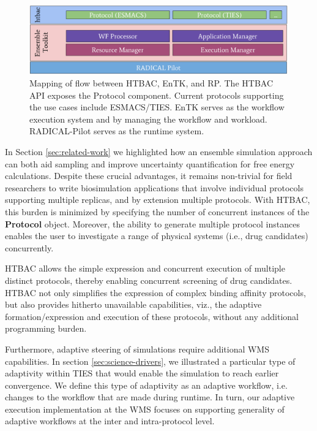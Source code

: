 \begin{figure}
  \centering
   \includegraphics[width=\columnwidth]{figures/isc_htbac_integration_with_entk_RP-4.pdf}
  \caption{Mapping of flow between HTBAC, EnTK, and RP. The HTBAC API exposes the Protocol
  component. Current protocols supporting the use cases include ESMACS/TIES.  
  EnTK serves as the workflow execution system and by managing the workflow and workload. 
  RADICAL-Pilot serves as the runtime system.}
\label{fig:integration}
\end{figure}



In Section \ref{sec:related-work} we highlighted how an ensemble
simulation approach can both aid sampling and improve uncertainty
quantification for free energy calculations. Despite these crucial advantages,
it remains non-trivial for field researchers to write biosimulation
applications that involve individual protocols supporting multiple replicas,
and by extension multiple protocols. With HTBAC, this burden is minimized by
specifying the number of concurrent instances of the \textbf{Protocol} object.
Moreover, the ability to generate multiple protocol instances enables the user
to investigate a range of physical systems (i.e., drug candidates)
concurrently.

HTBAC allows the simple expression and concurrent execution of multiple
distinct protocols, thereby enabling concurrent screening of drug candidates.
HTBAC not only simplifies the expression of complex binding affinity
protocols, but also provides hitherto unavailable capabilities, viz., the
adaptive formation/expression and execution of these protocols, without any
additional programming burden. 

Furthermore, adaptive steering of simulations require additional WMS capabilities. 
In section \ref{sec:science-drivers}, we illustrated a particular type of adaptivity 
within TIES that would enable the simulation to reach earlier convergence.
We define this type of adaptivity as an adaptive workflow, i.e. changes to the 
workflow that are made during runtime. In turn, our 
adaptive execution implementation at the WMS focuses on supporting generality of 
adaptive workflows at the inter and intra-protocol level. 


